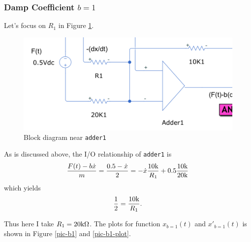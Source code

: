 \subsubsection*{Damp Coefficient $b=1$}

Let's focus on $R_1$ in Figure \ref{pic-r1}.

\begin{figure}[h!]
  \centering
  \includegraphics[scale=0.5]{pics/adder1-r1.png}
  \caption{Block diagram near \texttt{adder1}}
  \label{pic-r1}
\end{figure}

As is discussed above, the I/O relationship of \texttt{adder1} is
\[ \frac{F(t)-b\dot{x}}{m}=\frac{0.5-\dot{x}}{2}=-\dot{x}\frac{10\text{k}}{R_1}
+0.5\frac{10\text{k}}{20\text{k}} \]
which yields
\[\frac{1}{2}=\frac{10\text{k}}{R_1}.\]

Thus here I take $R_1=20\text{k}\Omega$. The plots for function $x_{b=1}(t)$
and $x'_{b=1}(t)$ is shown in Figure \ref{pic-b1} and \ref{pic-b1-plot}.

